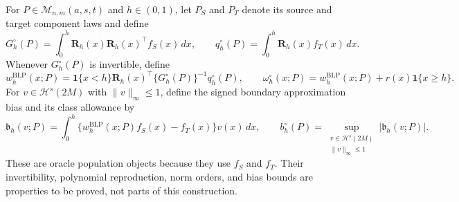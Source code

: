 For \(P\in\mathcal M_{n,m}(a,s,t)\) and \(h\in(0,1)\), let \(P_S\) and \(P_T\) denote its source and target component laws and define
\[
G_h^{\circ}(P)=\int_0^h\mathbf R_h(x)\mathbf R_h(x)^\top f_S(x)\,dx,
\qquad
q_h^{\circ}(P)=\int_0^h\mathbf R_h(x)f_T(x)\,dx.
\]
Whenever \(G_h^{\circ}(P)\) is invertible, define
\[
w_h^{\mathrm{BLP}}(x;P)=\mathbf 1\{x<h\}\mathbf R_h(x)^\top
\{G_h^{\circ}(P)\}^{-1}q_h^{\circ}(P),
\qquad
\omega_h^{\circ}(x;P)=w_h^{\mathrm{BLP}}(x;P)+r(x)\mathbf 1\{x\ge h\}.
\]
For \(v\in\mathcal H^s(2M)\) with \(\|v\|_\infty\le1\), define the signed boundary approximation bias and its class allowance by
\[
\mathfrak b_h(v;P)=\int_0^h\{w_h^{\mathrm{BLP}}(x;P)f_S(x)-f_T(x)\}v(x)\,dx,
\qquad
b_h^{\circ}(P)=\sup_{\substack{v\in\mathcal H^s(2M)\\\|v\|_\infty\le1}}|\mathfrak b_h(v;P)|.
\]
These are oracle population objects because they use \(f_S\) and \(f_T\). Their invertibility, polynomial reproduction, norm orders, and bias bounds are properties to be proved, not parts of this construction.